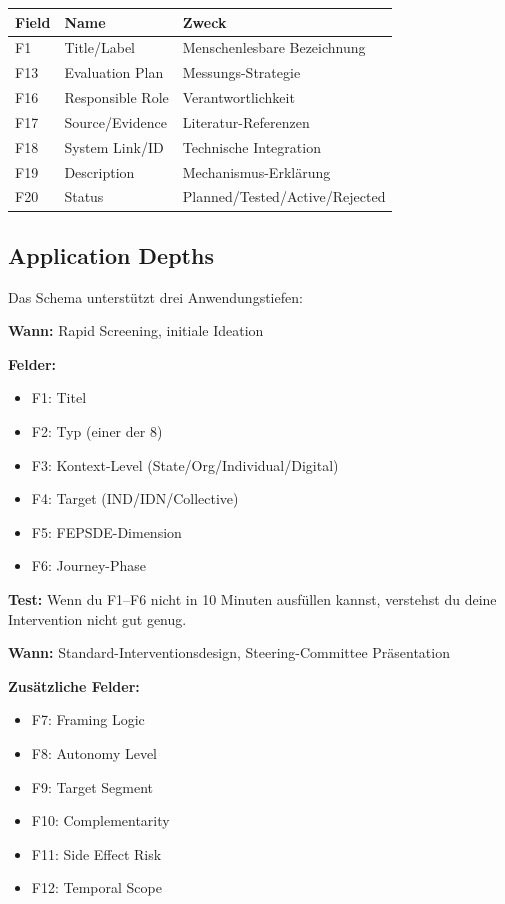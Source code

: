\begin{center}
\renewcommand{\arraystretch}{1.3}
\small
\begin{tabular}{@{}lll@{}}
\toprule
\textbf{Field} & \textbf{Name} & \textbf{Zweck} \\
\midrule
F1 & Title/Label & Menschenlesbare Bezeichnung \\
F13 & Evaluation Plan & Messungs-Strategie \\
F16 & Responsible Role & Verantwortlichkeit \\
F17 & Source/Evidence & Literatur-Referenzen \\
F18 & System Link/ID & Technische Integration \\
F19 & Description & Mechanismus-Erklärung \\
F20 & Status & Planned/Tested/Active/Rejected \\
\bottomrule
\end{tabular}
\end{center}


\subsection{Application Depths}
\label{sec:17-depths}

Das Schema unterstützt drei Anwendungstiefen:

\begin{tcolorbox}[colback=green!5!white, colframe=green!75!black,
    title=Light Mode: F1--F6 (10 Minuten)]
\textbf{Wann:} Rapid Screening, initiale Ideation

\textbf{Felder:}
\begin{itemize}[nosep]
\item F1: Titel
\item F2: Typ (einer der 8)
\item F3: Kontext-Level (State/Org/Individual/Digital)
\item F4: Target (IND/IDN/Collective)
\item F5: FEPSDE-Dimension
\item F6: Journey-Phase
\end{itemize}

\textbf{Test:} Wenn du F1--F6 nicht in 10 Minuten ausfüllen kannst, verstehst du deine Intervention nicht gut genug.
\end{tcolorbox}

\begin{tcolorbox}[colback=yellow!5!white, colframe=yellow!75!black,
    title=Hybrid Mode: F1--F12 (30 Minuten)]
\textbf{Wann:} Standard-Interventionsdesign, Steering-Committee Präsentation

\textbf{Zusätzliche Felder:}
\begin{itemize}[nosep]
\item F7: Framing Logic
\item F8: Autonomy Level
\item F9: Target Segment
\item F10: Complementarity
\item F11: Side Effect Risk
\item F12: Temporal Scope
\end{itemize}
\end{tcolorbox}

